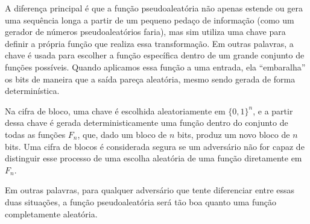 A diferença principal é que a função pseudoaleatória não apenas estende ou gera uma sequência longa a partir de um pequeno pedaço de informação (como um gerador de números pseudoaleatórios faria), mas sim utiliza uma chave para definir a própria função que realiza essa transformação.
Em outras palavras, a chave é usada para escolher a função específica dentro de um grande conjunto de funções possíveis.
Quando aplicamos essa função a uma entrada, ela ``embaralha'' os bits de maneira que a saída pareça aleatória, mesmo sendo gerada de forma determinística.

\begin{center}
\end{center}

Na cifra de bloco, uma chave é escolhida aleatoriamente em $\{0,1\}^n$, e a partir dessa chave é gerada deterministicamente uma função dentro do conjunto de todas as funções $F_n$, que, dado um bloco de $n$ bits, produz um novo bloco de $n$ bits.
Uma cifra de blocos é considerada segura se um adversário não for capaz de distinguir esse processo de uma escolha aleatória de uma função diretamente em $F_n$.

Em outras palavras, para qualquer adversário que tente diferenciar entre essas duas situações, a função pseudoaleatória será tão boa quanto uma função completamente aleatória.

